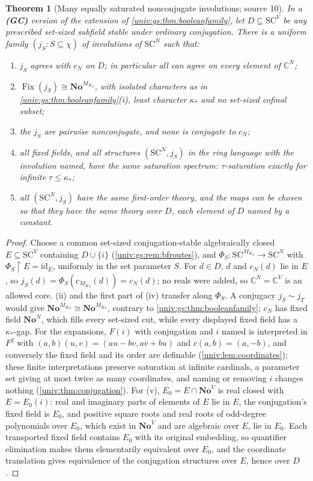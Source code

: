 \documentclass[11pt,letterpaper]{article}
\numberwithin{equation}{section}
\newtheorem{theorem}{Theorem}[section]
\theoremstyle{definition}
\theoremstyle{remark}
\newcommand{\No}{\mathbf{No}}
\newcommand{\SC}{\mathrm{SC}}
\newcommand{\NoN}{\No^{N}}
\newcommand{\SCN}{\SC^{N}}
\newcommand{\C}{\mathbb C}
\newcommand{\Fix}{\operatorname{Fix}}
\newcommand{\res}{\mathbin{\upharpoonright}}
\begin{document}
\begin{theorem}[Many equally saturated nonconjugate involutions; source 10]\label{univ:gs:thm:boolinvolutions0}
In a \textbf{(GC)} version of the extension of \cref{univ:gs:thm:booleanfamily}, let
$D\subseteq\SC^V$ be any prescribed set-sized subfield stable under ordinary conjugation. There is a
uniform family $(j_S:S\subseteq\chi)$ of involutions of $\SCN$ such that:
\begin{enumerate}[label=\textnormal{(\roman*)}]
\item $j_S$ agrees with $c_N$ on $D$; in particular all can agree on every element of $\C^N$;
\item $\Fix(j_S)\cong\No^{M_{K_S}}$, with isolated characters as in
\cref{univ:gs:thm:booleanfamily}(i), least character $\kappa_*$ and no set-sized cofinal subset;
\item the $j_S$ are pairwise nonconjugate, and none is conjugate to $c_N$;
\item all fixed fields, and all structures $(\SCN,j_S)$ in the ring language with the involution
named, have the same saturation spectrum: $\tau$-saturation exactly for infinite
$\tau\le\kappa_*$;
\item all $(\SCN,j_S)$ have the same first-order theory, and the maps can be chosen so that they
have the same theory over $D$, each element of $D$ named by a constant.
\end{enumerate}
\end{theorem}
\begin{proof}
Choose a common set-sized conjugation-stable algebraically closed $E\subseteq\SC^V$ containing
$D\cup\{i\}$ (\cref{univ:gs:rem:bfroutes}), and $\Phi_S:\SC^{M_{K_S}}\to\SCN$ with
$\Phi_S\res E=\mathrm{id}_E$, uniformly in the set parameter $S$. For $d\in D$, $d$ and $c_N(d)$ lie
in $E$, so $j_S(d)=\Phi_S(c_{M_{K_S}}(d))=c_N(d)$; no reals were added, so $\C^N=\C^V$ is an
allowed core. (ii) and the first part of (iv) transfer along $\Phi_S$. A conjugacy $j_S\sim j_T$
would give $\No^{M_{K_S}}\cong\No^{M_{K_T}}$, contrary to \cref{univ:gs:thm:booleanfamily}; $c_N$
has fixed field $\NoN$, which fills every set-sized cut, while every displayed fixed field has a
$\kappa_*$-gap. For the expansions, $F(i)$ with conjugation and $i$ named is interpreted in $F^2$
with $(a,b)(u,v)=(au-bv,av+bu)$ and $c(a,b)=(a,-b)$, and conversely the fixed field and its order
are definable (\cref{univ:lem:coordinates}); these finite interpretations preserve saturation at
infinite cardinals, a parameter set giving at most twice as many coordinates, and naming or
removing $i$ changes nothing (\cref{univ:thm:conjugation}). For (v), $E_0=E\cap\No^V$ is real
closed with $E=E_0(i)$: real and imaginary parts of elements of $E$ lie in $E$, the conjugation's
fixed field is $E_0$, and positive square roots and real roots of odd-degree polynomials over
$E_0$, which exist in $\No^V$ and are algebraic over $E$, lie in $E_0$. Each transported fixed
field contains $E_0$ with its original embedding, so quantifier elimination makes them
elementarily equivalent over $E_0$, and the coordinate translation gives equivalence of the
conjugation structures over $E$, hence over $D$.
\end{proof}
\end{document}
